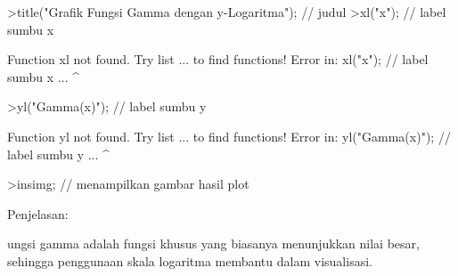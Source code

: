 \documentclass{article}
\begin{document}
\begin{eulernotebook}
\begin{eulercomment}
\begin{eulercomment}
\begin{eulercomment}
\begin{eulercomment}
\begin{eulercomment}
\begin{eulercomment}
\begin{eulercomment}
\begin{eulercomment}
\begin{eulercomment}
\begin{eulercomment}
\begin{eulercomment}
\begin{eulercomment}
\begin{eulercomment}
\begin{eulercomment}
\begin{eulercomment}
\begin{eulercomment}
\begin{eulercomment}
\begin{eulercomment}
\begin{eulercomment}
\begin{eulercomment}
\begin{eulercomment}
\begin{eulercomment}
\begin{eulercomment}
\begin{eulercomment}
\begin{eulercomment}
\begin{eulercomment}
\begin{eulercomment}
\begin{eulercomment}
\begin{euleroutput}
\end{euleroutput}
\begin{eulerprompt}
>title("Grafik Fungsi Gamma dengan y-Logaritma"); // judul
>xl("x"); // label sumbu x
\end{eulerprompt}
\begin{euleroutput}
  Function xl not found.
  Try list ... to find functions!
  Error in:
  xl("x"); // label sumbu x ...
         ^
\end{euleroutput}
\begin{eulerprompt}
>yl("Gamma(x)"); // label sumbu y
\end{eulerprompt}
\begin{euleroutput}
  Function yl not found.
  Try list ... to find functions!
  Error in:
  yl("Gamma(x)"); // label sumbu y ...
                ^
\end{euleroutput}
\begin{eulerprompt}
>insimg; // menampilkan gambar hasil plot
\end{eulerprompt}
\begin{eulercomment}
Penjelasan:

ungsi gamma adalah fungsi khusus yang biasanya menunjukkan nilai
besar, sehingga penggunaan skala logaritma membantu dalam visualisasi.


\end{eulercomment}
\end{eulercomment}
\end{eulercomment}
\end{eulercomment}
\end{eulercomment}
\end{eulercomment}
\end{eulercomment}
\end{eulercomment}
\end{eulercomment}
\end{eulercomment}
\end{eulercomment}
\end{eulercomment}
\end{eulercomment}
\end{eulercomment}
\end{eulercomment}
\end{eulercomment}
\end{eulercomment}
\end{eulercomment}
\end{eulercomment}
\end{eulercomment}
\end{eulercomment}
\end{eulercomment}
\end{eulercomment}
\end{eulercomment}
\end{eulercomment}
\end{eulercomment}
\end{eulercomment}
\end{eulercomment}
\end{eulercomment}
\end{eulernotebook}
\end{document}
